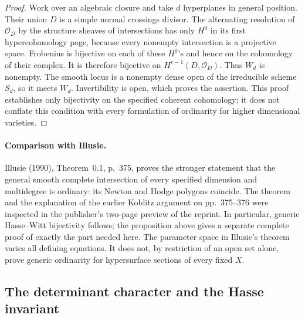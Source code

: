\begin{proof}
Work over an algebraic closure and take $d$ hyperplanes in general
position.  Their union $D$ is a simple normal crossings divisor.
The alternating resolution of $\mathcal O_D$ by the structure sheaves
of intersections has only $H^0$ in its first hypercohomology page,
because every nonempty intersection is a projective space.  Frobenius
is bijective on each of these $H^0$'s and hence on the cohomology of
their complex.  It is therefore bijective on
$H^{r-1}(D,\mathcal O_D)$.  Thus $W_d$ is nonempty.  The smooth locus
is a nonempty dense open of the irreducible scheme $S_d$, so it meets
$W_d$.  Invertibility is open, which proves the assertion.  This proof
establishes only bijectivity on the specified coherent cohomology;
it does not conflate this condition with every formulation of
ordinarity for higher dimensional varieties.
\end{proof}

\paragraph{Comparison with Illusie.}
Illusie (1990), Theorem~0.1, p.~375, proves the stronger statement that
the general smooth complete intersection of every specified dimension
and multidegree is ordinary: its Newton and Hodge polygons coincide.
The theorem and the explanation of the earlier Koblitz argument on
pp.~375--376 were inspected in the publisher's two-page preview of
the reprint.  In particular, generic Hasse--Witt bijectivity follows;
the proposition above gives a separate complete proof of exactly the
part needed here.  The parameter space in Illusie's theorem varies all
defining equations.  It does not, by restriction of an open set alone,
prove generic ordinarity for hypersurface sections of every fixed $X$.

\subsection{The determinant character and the Hasse invariant}
\label{subsec:hasse-determinant}


